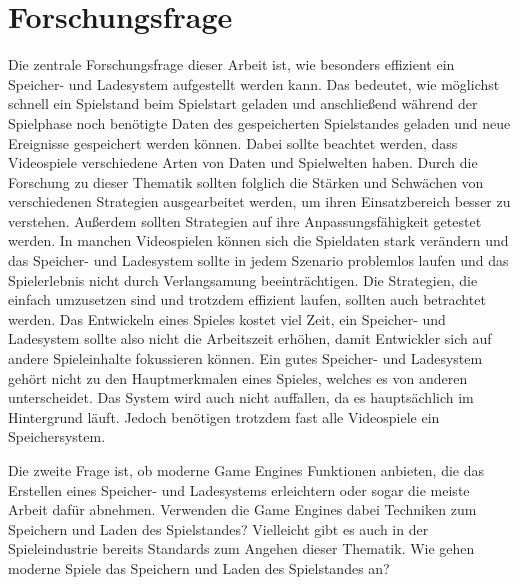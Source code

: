 \section{Forschungsfrage}
Die zentrale Forschungsfrage dieser Arbeit ist, wie besonders effizient ein Speicher- und Ladesystem aufgestellt werden kann. Das bedeutet, wie möglichst schnell ein Spielstand beim Spielstart geladen und anschließend während der Spielphase noch benötigte Daten des gespeicherten Spielstandes geladen und neue Ereignisse gespeichert werden können. Dabei sollte beachtet werden, dass Videospiele verschiedene Arten von Daten und Spielwelten haben. Durch die Forschung zu dieser Thematik sollten folglich die Stärken und Schwächen von verschiedenen Strategien ausgearbeitet werden, um ihren Einsatzbereich besser zu verstehen. Außerdem sollten Strategien auf ihre Anpassungsfähigkeit getestet werden. In manchen Videospielen können sich die Spieldaten stark verändern und das Speicher- und Ladesystem sollte in jedem Szenario problemlos laufen und das Spielerlebnis nicht durch Verlangsamung beeinträchtigen. Die Strategien, die einfach umzusetzen sind und trotzdem effizient laufen, sollten auch betrachtet werden. Das Entwickeln eines Spieles kostet viel Zeit, ein Speicher- und Ladesystem sollte also nicht die Arbeitszeit erhöhen, damit Entwickler sich auf andere Spieleinhalte fokussieren können. Ein gutes Speicher- und Ladesystem gehört nicht zu den Hauptmerkmalen eines Spieles, welches es von anderen unterscheidet. Das System wird auch nicht auffallen, da es hauptsächlich im Hintergrund läuft. Jedoch benötigen trotzdem fast alle Videospiele ein Speichersystem.  

Die zweite Frage ist, ob moderne Game Engines Funktionen anbieten, die das Erstellen eines Speicher- und Ladesystems erleichtern oder sogar die meiste Arbeit dafür abnehmen. Verwenden die Game Engines dabei Techniken zum Speichern und Laden des Spielstandes? Vielleicht gibt es auch in der Spieleindustrie bereits Standards zum Angehen dieser Thematik. Wie gehen moderne Spiele das Speichern und Laden des Spielstandes an?
